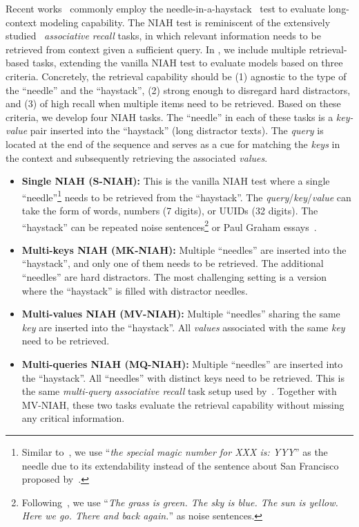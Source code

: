 Recent works~\citep{gemini,claude200kprompting} commonly employ the needle-in-a-haystack~\citep[][NIAH]{needle} test to evaluate long-context modeling capability. The NIAH test is reminiscent of the extensively studied~\citep{Hopfield1982NeuralNA,neuralturingmachine,inductionhead,mqar} \emph{associative recall} tasks, in which relevant information needs to be retrieved from context given a sufficient query. In , we include multiple retrieval-based tasks, extending the vanilla NIAH test to evaluate models based on three criteria. Concretely, the retrieval capability should be (1) agnostic to the type of the ``needle'' and the ``haystack'', (2) strong enough to disregard hard distractors, and (3) of high recall when multiple items need to be retrieved. Based on these criteria, we develop four NIAH tasks. The ``needle'' in each of these tasks is a \emph{key-value} pair inserted into the ``haystack'' (long distractor texts). The \emph{query} is located at the end of the sequence and serves as a cue for matching the \emph{keys} in the context and subsequently retrieving the associated \emph{values}. 
\begin{itemize}[leftmargin=0.8em]
\itemsep0em 
\item \textbf{Single NIAH (S-NIAH): } This is the vanilla NIAH test where a single ``needle''\footnote{Similar to~\citet{lwm}, we use ``\emph{the special magic number for XXX is: YYY}'' as the needle due to its extendability instead of the sentence about San Francisco proposed by~\citet{needle}.} needs to be retrieved from the ``haystack''.
The \emph{query}/\emph{key}/\emph{value} can take the form of words, numbers (7 digits), or UUIDs (32 digits). The ``haystack'' can be repeated noise sentences\footnote{ Following~\citet{landmark}, we use ``\emph{The grass is green. The sky is blue. The sun is yellow. Here we go. There and back again.}'' as noise sentences.} or Paul Graham essays~\citep{needle}.

\item \textbf{Multi-keys NIAH (MK-NIAH): } Multiple ``needles'' are inserted into the ``haystack'', and only one of them needs to be retrieved. The additional ``needles'' are hard distractors. The most challenging setting is a version where the ``haystack'' is filled with distractor needles.

\item \textbf{Multi-values NIAH (MV-NIAH): } Multiple ``needles'' sharing the same \emph{key} are inserted into the ``haystack''. All \emph{values} associated with the same \emph{key} need to be retrieved. 

\item \textbf{Multi-queries NIAH (MQ-NIAH): } Multiple ``needles'' are inserted into the ``haystack''. All ``needles'' with distinct keys need to be retrieved. This is the same \emph{multi-query associative recall} task setup used by~\citet{mqar}. Together with MV-NIAH, these two tasks evaluate the retrieval capability without missing any critical information.
\end{itemize}

